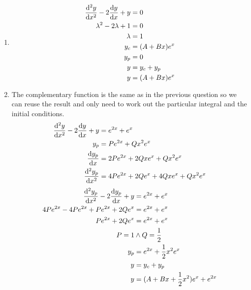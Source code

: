 \documentclass[10pt,\jkfside,a4paper]{article}
\begin{document}
\begin{enumerate}
\begin{enumerate}
\item
\begin{equation}
\begin{split}
\dv[2]{y}{x} - 2\dv{y}{x} + y &= 0\\
\lambda^2 - 2\lambda + 1 &= 0\\
\lambda &= 1\\
y_c &= (A + Bx)e^{x}\\
y_p &= 0\\
y &= y_c + y_p\\
y &= (A + Bx)e^{x}\\
\end{split}
\end{equation}

\item
The complementary function is the same as in the previous question so we can reuse the result and only 
need to work out the particular integral and the initial conditions.
\begin{equation}
\begin{split}
\dv[2]{y}{x} - 2\dv{y}{x} + y &= e^{2x} + e^{x}\\
y_p &= Pe^{2x} + Qx^2e^x\\
\dv{y_p}{x} &= 2Pe^{2x} + 2Qxe^x + Qx^2e^x\\
\dv[2]{y_p}{x} &= 4Pe^{2x} + 2Qe^x + 4Qxe^x + Qx^2e^x\\
\end{split}
\end{equation}
\begin{equation}
\begin{split}
\dv[2]{y_p}{x} - 2\dv{y_p}{x} + y &= e^{2x} + e^{x}\\
4Pe^{2x} - 4Pe^{2x} + Pe^{2x} + 2Qe^x &= e^{2x} + e^x\\
Pe^{2x} + 2Qe^x &= e^{2x} + e^x\\
P = 1 &\wedge Q = \frac{1}{2}\\
y_p &= e^{2x} + \frac{1}{2}x^2e^x\\
y &= y_c + y_p \\
y &= (A + Bx + \frac{1}{2}x^2)e^{x} + e^{2x}\\
\end{split}
\end{equation}

\end{enumerate}


\end{enumerate}
\end{document}
